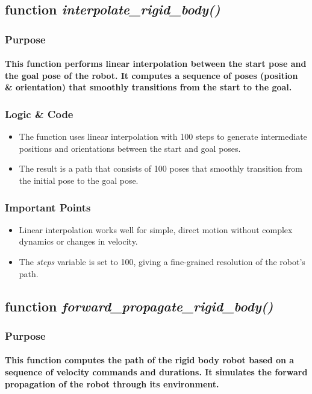 \documentclass[12pt, letterpaper]{article}
\begin{document}
\subsection{function \textit{interpolate\_rigid\_body()}}
\subsubsection{Purpose}
\paragraph{This function performs linear interpolation between the start pose and the goal pose of the robot. It computes a sequence of poses (position \& orientation) that smoothly transitions from the start to the goal.}
\subsubsection{Logic \& Code}
\begin{itemize}
    \item{The function uses linear interpolation with 100 steps to generate intermediate positions and orientations between the start and goal poses.}
    \item{The result is a path that consists of 100 poses that smoothly transition from the initial pose to the goal pose.}
\end{itemize}
\subsubsection{Important Points}
\begin{itemize}
    \item{Linear interpolation works well for simple, direct motion without complex dynamics or changes in velocity.}
    \item{The \textit{steps} variable is set to 100, giving a fine-grained resolution of the robot's path.}
\end{itemize}
\subsection{function \textit{forward\_propagate\_rigid\_body()}}
\subsubsection{Purpose}
\paragraph{This function computes the path of the rigid body robot based on a sequence of velocity commands and durations. It simulates the forward propagation of the robot through its environment.}
\end{document}
